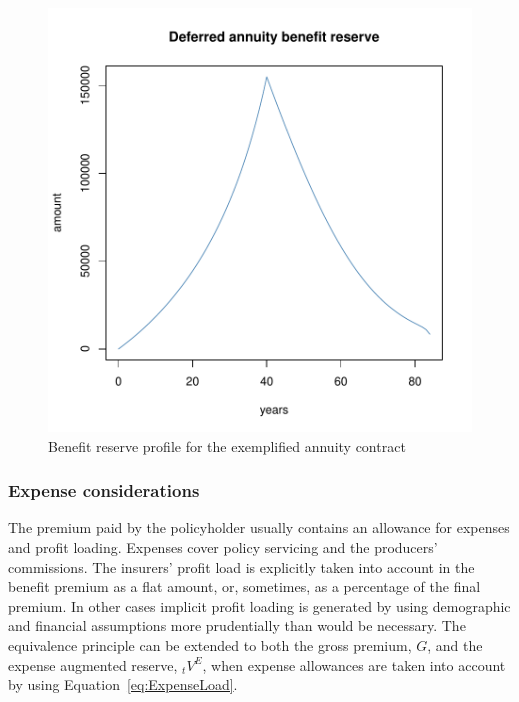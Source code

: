 \documentclass[nojss]{jss}
\begin{document}
\begin{figure}
\begin{center}
\includegraphics{an_introduction_to_lifecontingencies_package-annuityReserveGraph}
\caption{Benefit reserve profile for the exemplified annuity contract}
\label{fig:annres}
\end{center}
\end{figure}

\clearpage

\subsubsection{Expense considerations}\label{sss:expenses}

The premium paid by the policyholder usually contains an allowance for expenses
and profit loading. Expenses cover policy servicing and the producers' commissions. The insurers' profit load is explicitly  taken into account  in the  benefit premium as a flat amount, or, sometimes, as a percentage of the final premium. In other cases  implicit profit  loading is generated by using demographic and financial assumptions more prudentially than would be necessary. The equivalence principle can be extended to both the gross premium, $G$, and the expense augmented reserve,  ${}_{t}V^{E}$, when expense
allowances are taken into account by using Equation~\ref{eq:ExpenseLoad}.
\end{document}
